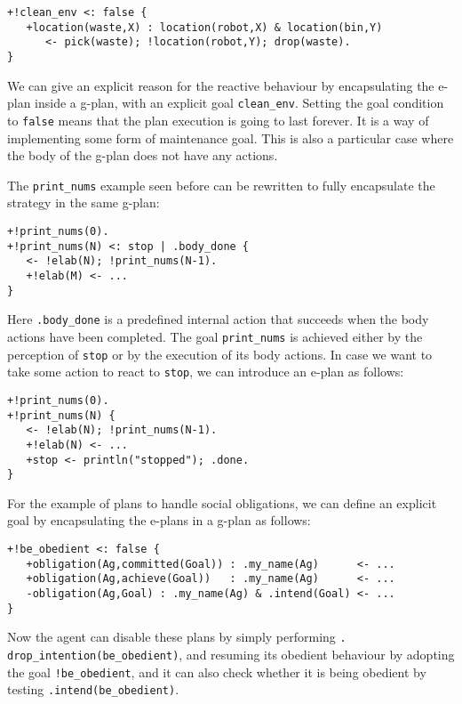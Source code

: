 \begin{small}
\begin{verbatim}
+!clean_env <: false {
   +location(waste,X) : location(robot,X) & location(bin,Y)
      <- pick(waste); !location(robot,Y); drop(waste).
}
\end{verbatim}
\end{small}

\noindent We can give an explicit reason for the reactive behaviour by
encapsulating the e-plan inside a g-plan, with an explicit goal
\texttt{clean\_env}.
%
Setting the goal condition to \texttt{false} means that the plan
execution is going to last forever. It is a way of implementing some
form of maintenance goal.
%
This is also a particular case where the body of the g-plan does not
have any actions.
%

The \texttt{print\_nums} example seen before can be rewritten to fully
encapsulate the strategy in the same g-plan:

{\small
\begin{verbatim}
+!print_nums(0).
+!print_nums(N) <: stop | .body_done {
   <- !elab(N); !print_nums(N-1).	
   +!elab(M) <- ...
}
\end{verbatim}}

  \noindent Here \texttt{.body\_done} is a predefined internal action
  that succeeds when the body actions have been completed. The goal
  \texttt{print\_nums} is achieved either by the perception of
  \texttt{stop} or by the execution of its body actions.
%
  In case we want to take some action to react to \texttt{stop}, we
  can introduce an e-plan as follows:

{\small
\begin{verbatim}
+!print_nums(0).
+!print_nums(N) {
   <- !elab(N); !print_nums(N-1).
   +!elab(N) <- ...
   +stop <- println("stopped"); .done.
}
\end{verbatim}}

  For the example of plans to handle social obligations, we can define
  an explicit goal by encapsulating the e-plans in a g-plan as
  follows:
\begin{small}
\begin{verbatim}
+!be_obedient <: false {
   +obligation(Ag,committed(Goal)) : .my_name(Ag)      <- ...
   +obligation(Ag,achieve(Goal))   : .my_name(Ag)      <- ...
   -obligation(Ag,Goal) : .my_name(Ag) & .intend(Goal) <- ...
}
\end{verbatim}
\end{small}
\noindent Now the agent can disable these plans by simply performing
\texttt{. drop\_intention(be\_obedient)}, and resuming its obedient
behaviour by adopting the goal \texttt{!be\_obedient}, and it can also
check whether it is being obedient by testing
\texttt{.intend(be\_obedient)}.


